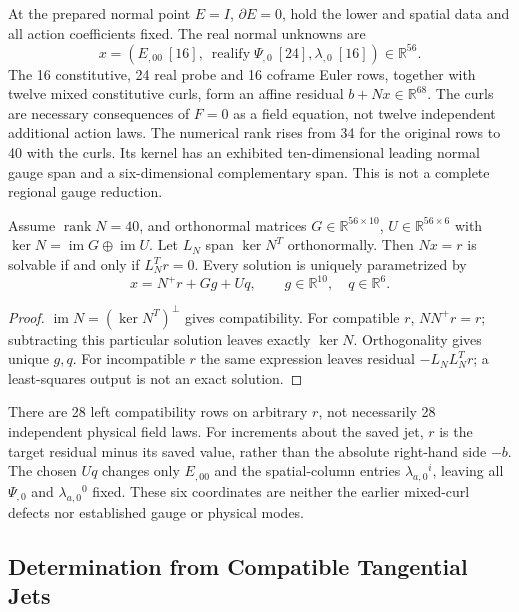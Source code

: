At the prepared normal point $E=I$, $\partial E=0$, hold the lower and
spatial data and all action coefficients fixed. The real normal unknowns
are
\[
 x=(E_{,00}\ [16],\ \operatorname{realify}\Psi_{,0}\ [24],
                    \lambda_{,0}\ [16])\in\mathbb R^{56}.
\]
The 16 constitutive, 24 real probe and 16 coframe Euler rows, together
with twelve mixed constitutive curls, form an affine residual
$b+Nx\in\mathbb R^{68}$. The curls are necessary consequences of
$F=0$ as a field equation, not twelve independent additional action laws.
The numerical rank rises from 34 for the original rows to 40 with the
curls. Its kernel has an exhibited ten-dimensional leading normal gauge
span and a six-dimensional complementary span. This is not a complete
regional gauge reduction.

\begin{proposition}
\label{v490:normal-inverse}
Assume $\operatorname{rank}N=40$, and orthonormal matrices
$G\in\mathbb R^{56\times10}$, $U\in\mathbb R^{56\times6}$ with
$\ker N=\operatorname{im}G\mathbin{\oplus}\operatorname{im}U$.
Let $L_N$ span $\ker N^T$ orthonormally. Then $Nx=r$ is solvable if and
only if $L_N^Tr=0$. Every solution is uniquely parametrized by
\[
 x=N^+r+Gg+Uq,\qquad g\in\mathbb R^{10},\quad q\in\mathbb R^6.
\]
\end{proposition}
\begin{proof}
$\operatorname{im}N=(\ker N^T)^\perp$ gives compatibility.
For compatible $r$, $NN^+r=r$; subtracting this particular solution
leaves exactly $\ker N$. Orthogonality gives unique $g,q$.
For incompatible $r$ the same expression leaves residual $-L_NL_N^Tr$;
a least-squares output is not an exact solution.
\end{proof}

There are 28 left compatibility rows on arbitrary $r$, not necessarily
28 independent physical field laws. For increments about the saved jet,
$r$ is the target residual minus its saved value, rather than the absolute
right-hand side $-b$. The chosen $Uq$ changes only $E_{,00}$ and the
spatial-column entries $\lambda_{a,0}{}^i$, leaving all $\Psi_{,0}$
and $\lambda_{a,0}{}^0$ fixed. These six coordinates are neither the
earlier mixed-curl defects nor established gauge or physical modes.

\subsection{Determination from Compatible Tangential Jets}
\label{v490:source-law}

